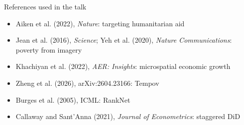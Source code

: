 \documentclass[11pt,aspectratio=169]{beamer}
\begin{document}
\begin{frame}[label=b19]{References used in the talk}

\small
\begin{itemize}
\item Aiken et al. (2022), \emph{Nature}: targeting humanitarian aid
\item Jean et al. (2016), \emph{Science}; Yeh et al. (2020), \emph{Nature Communications}: poverty from imagery
\item Khachiyan et al. (2022), \emph{AER: Insights}: microspatial economic growth
\item Zheng et al. (2026), arXiv:2604.23166: Tempov
\item Burges et al. (2005), ICML: RankNet
\item Callaway and Sant'Anna (2021), \emph{Journal of Econometrics}: staggered DiD
\end{itemize}

\note{}
\end{frame}
\end{document}
